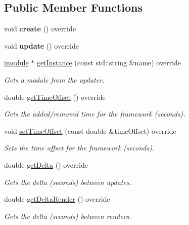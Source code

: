 \subsection*{Public Member Functions}
\begin{DoxyCompactItemize}
\item 
\mbox{\label{classflounder_1_1glfwupdater_acd58077965d5ba137961c567d7d79aa9}} 
void {\bfseries create} () override
\item 
\mbox{\label{classflounder_1_1glfwupdater_a2443d270f702e67ab44c7afb88c71a5e}} 
void {\bfseries update} () override
\item 
\hyperlink{classflounder_1_1imodule}{imodule} $\ast$ \hyperlink{classflounder_1_1glfwupdater_a284945635b93ffc1bd6164ff20565349}{get\+Instance} (const std\+::string \&name) override
\begin{DoxyCompactList}\small\item\em Gets a module from the updater. \end{DoxyCompactList}\item 
double \hyperlink{classflounder_1_1glfwupdater_a6393f60d2b0f84a78ccf14b0c55ae1ee}{get\+Time\+Offset} () override
\begin{DoxyCompactList}\small\item\em Gets the added/removed time for the framework (seconds). \end{DoxyCompactList}\item 
void \hyperlink{classflounder_1_1glfwupdater_a7dc4371863e39a3a7870e4a2ac539fed}{set\+Time\+Offset} (const double \&time\+Offset) override
\begin{DoxyCompactList}\small\item\em Sets the time offset for the framework (seconds). \end{DoxyCompactList}\item 
double \hyperlink{classflounder_1_1glfwupdater_a8da4916f3335126413a072203b94a735}{get\+Delta} () override
\begin{DoxyCompactList}\small\item\em Gets the delta (seconds) between updates. \end{DoxyCompactList}\item 
double \hyperlink{classflounder_1_1glfwupdater_a3f8d8a108c8db0d2ead35088646687c9}{get\+Delta\+Render} () override
\begin{DoxyCompactList}\small\item\em Gets the delta (seconds) between renders. \end{DoxyCompactList}\item 

\end{DoxyCompactItemize}
